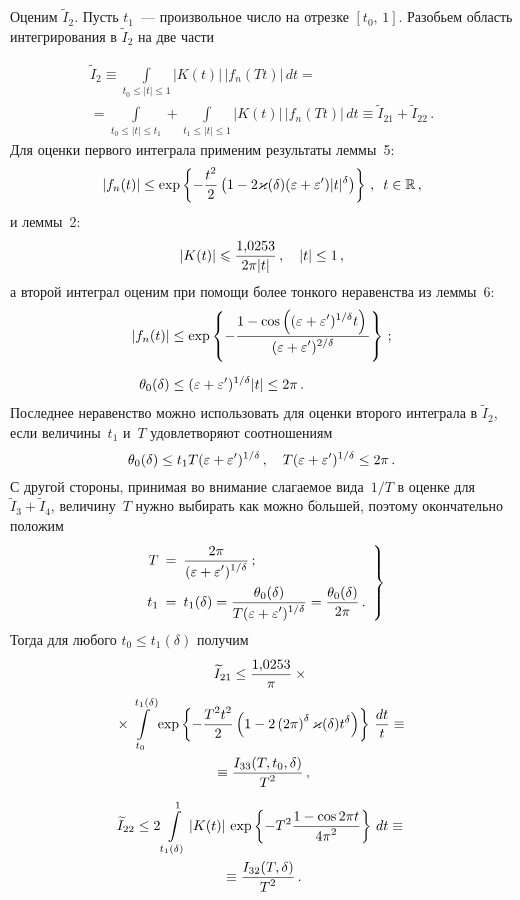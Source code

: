 \begin{multicols}{2}
Оценим $\widetilde I_2$. Пусть $t_1$~--- произвольное число на
отрезке $[t_0,\,1]$. Разобьем область интегрирования в $\widetilde
I_2$ на две части

\noindent
\begin{multline*}
\widetilde I_2\equiv
\int\limits_{t_0\le|t|\le1}|K(t)|\,|f_n(Tt)|\,dt={}\\[12pt]
{}=
\int\limits_{t_0\le |t|\le t_1}+
\int\limits_{t_1\le|t|\le1}|K(t)|\,|f_n(Tt)|\,dt\equiv \widetilde
I_{21}+\widetilde I_{22}\,.
\end{multline*}
Для оценки первого интеграла применим результаты леммы~5:
\begin{equation*}%
|f_n(t)|\le\exp\left\{-\fr{t^2}2\left(1-
2\varkappa(\delta)(\eps+\eps')|t|^{\delta}\right)\right\}\,,\enskip t\in\R\,,
\end{equation*}
и леммы~2:
$$
\left| K(t)\right| \leqslant \displaystyle\frac{\displaystyle 1{,}0253\mathstrut}{\displaystyle 2\pi|t|\mathstrut}\,,\quad |t|\le1\,,
$$
а второй интеграл оценим при помощи более тонкого неравенства из
леммы~6:
\begin{align*}
\left|f_n(t)\right|&\le \exp\left\{
-\displaystyle\frac{\displaystyle 1-\cos\left((\varepsilon+\varepsilon')^{1/\delta}t\right)\mathstrut}{\displaystyle (\varepsilon+\varepsilon')^{2/\delta}\mathstrut} \right\}\,;\\[6pt]
\theta_0(\delta) &\le
(\varepsilon+\varepsilon')^{1/\delta}|t|\le 2\pi\,.
\end{align*}
Последнее неравенство можно использовать для оценки второго
интеграла в $\widetilde I_2$, если величины~$t_1$ и~$T$
удовлетворяют соотношениям
$$
\theta_0(\delta)\le t_1 T(\varepsilon+\varepsilon')^{1/\delta}\,,\quad
T(\varepsilon+\varepsilon')^{1/\delta}\le 2\pi\,.
$$
С другой стороны, принимая во внимание сла\-га\-емое вида~$1/T$ в оценке
для $\widetilde I_3+\widetilde I_4$, величину~$T$ нужно выбирать как
можно б$\acute{\mbox{о}}$льшей, поэтому окончательно положим
\begin{equation}
\left.
\begin{array}{rcl}
T\!\!\!&=&\!\!\!\fr{2\pi}{(\eps+\eps')^{1/\delta}}\,;\\[12pt]
t_1\!\!\!&=&\!\!\!t_1(\delta)=\fr{\theta_0(\delta)}{T(\eps+\eps')^{1/\delta}}=
\fr{\theta_0(\delta)}{2\pi}\,.
\end{array}
\right \}
\label{choice T_t1}
\end{equation}
Тогда для любого $t_0\le t_1(\delta)$ получим
\begin{multline*} %
\widetilde I_{21} \le
\fr{1{,}0253}{\pi}\times{}\\
{}\times
\int\limits_{t_0}^{t_1(\delta)}
\exp\left\{-\fr{T^2t^2}{2}\left(1-2\left(2\pi\right)^\delta \varkappa(\delta)t^\delta\right)\right\}
\,\fr{dt}t\equiv{}\\
{}\equiv
 \fr{I_{33}(T,t_0,\delta)}{T^2}\,,
\end{multline*}
\begin{multline*}%
\widetilde I_{22} \le2\int\limits_{t_1(\delta)}^1|K(t)|\,
\exp\left\{-T^2\fr{1-\cos 2\pi t}{4\pi^2}\right\} \,dt\equiv{}\\
{}\equiv
\fr{I_{32}(T,\delta)}{T^2}\,.
\end{multline*}


\end{multicols}
